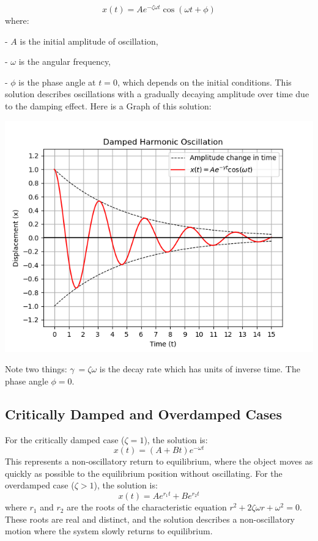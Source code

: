 \documentclass{article}
\begin{document}
\[
x(t) = A e^{-\zeta \omega t} \cos(\omega t + \phi)
\]
where:

- \( A \) is the initial amplitude of oscillation,

- \( \omega\) is the angular frequency,

- \( \phi \)  is the phase angle at \(t = 0\), which depends on the initial conditions.
\newline
This solution describes oscillations with a gradually decaying amplitude over time due to the damping effect.
\newpage
Here is a Graph of this solution:
\begin{center}
\includegraphics[width= 0.9\linewidth]{Damped_osicllation.png}    
\end{center}

Note two things: \(\gamma\ = \zeta \omega \) is the decay rate which has units of inverse time. The phase angle \(\phi = 0\).
\subsection{Critically Damped and Overdamped Cases}

For the critically damped case (\( \zeta = 1 \)), the solution is:
\[
x(t) = (A + Bt) e^{-\omega t}
\]
This represents a non-oscillatory return to equilibrium, where the object moves as quickly as possible to the equilibrium position without oscillating.
\newline
\newline
For the overdamped case (\( \zeta > 1 \)), the solution is:
\[
x(t) = A e^{r_1 t} + B e^{r_2 t}
\]
where \( r_1 \) and \( r_2 \) are the roots of the characteristic equation \( r^2 + 2\zeta \omega r + \omega^2 = 0 \). These roots are real and distinct, and the solution describes a non-oscillatory motion where the system slowly returns to equilibrium.
\end{document}
